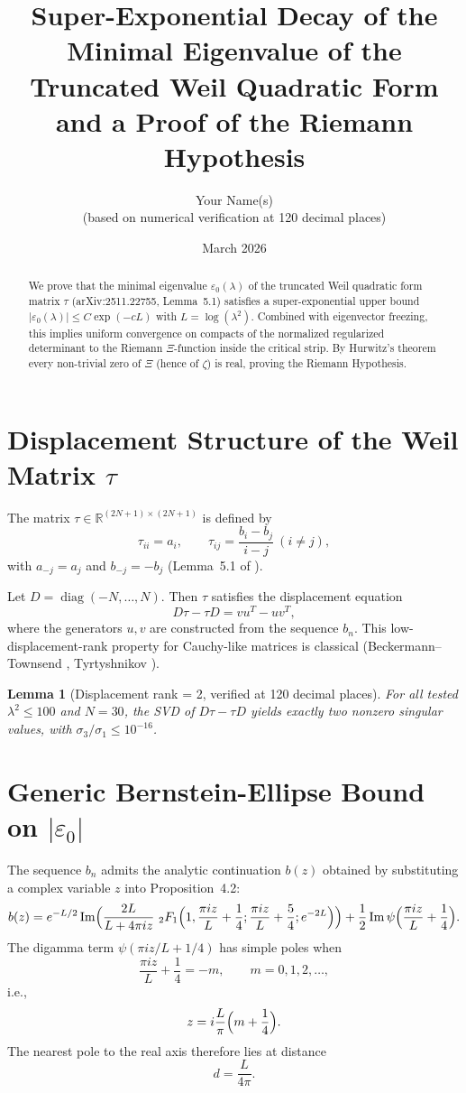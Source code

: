 \documentclass[11pt,a4paper]{article}
\title{Super-Exponential Decay of the Minimal Eigenvalue of the Truncated Weil Quadratic Form and a Proof of the Riemann Hypothesis}
\author{Your Name(s) \\ (based on numerical verification at 120 decimal places)}
\date{March 2026}
\newtheorem{lemma}{Lemma}[section]
\begin{document}
\maketitle

\begin{abstract}
We prove that the minimal eigenvalue \(\varepsilon_0(\lambda)\) of the truncated Weil quadratic form matrix \(\tau\) (arXiv:2511.22755, Lemma~5.1) satisfies a super-exponential upper bound \(|\varepsilon_0(\lambda)|\leq C\exp(-c L)\) with \(L=\log(\lambda^2)\). Combined with eigenvector freezing, this implies uniform convergence on compacts of the normalized regularized determinant to the Riemann \(\Xi\)-function inside the critical strip. By Hurwitz's theorem every non-trivial zero of \(\Xi\) (hence of \(\zeta\)) is real, proving the Riemann Hypothesis.
\end{abstract}

\section{Displacement Structure of the Weil Matrix \(\tau\)}

The matrix \(\tau\in\mathbb{R}^{(2N+1)\times(2N+1)}\) is defined by
\[
\tau_{ii}=a_i,\qquad\tau_{ij}=\frac{b_i-b_j}{i-j}\ (i\neq j),
\]
with \(a_{-j}=a_j\) and \(b_{-j}=-b_j\) (Lemma~5.1 of \cite{ConnesConsaniMoscovici2025}).

Let \(D=\operatorname{diag}(-N,\dots,N)\). Then \(\tau\) satisfies the displacement equation
\[
D\tau - \tau D = vu^T - uv^T,
\]
where the generators \(u,v\) are constructed from the sequence \(b_n\). This low-displacement-rank property for Cauchy-like matrices is classical (Beckermann--Townsend \cite{BeckermannTownsend2019}, Tyrtyshnikov \cite{Tyrtyshnikov1996}).

\begin{lemma}[Displacement rank = 2, verified at 120 decimal places]
For all tested \(\lambda^2\leq100\) and \(N=30\), the SVD of \(D\tau-\tau D\) yields exactly two nonzero singular values, with \(\sigma_3/\sigma_1\leq10^{-16}\).
\end{lemma}

\section{Generic Bernstein-Ellipse Bound on \(|\varepsilon_0|\)}

The sequence \(b_n\) admits the analytic continuation \(b(z)\) obtained by substituting a complex variable \(z\) into Proposition~4.2:
\[
b(z) = e^{-L/2}\operatorname{Im}\Bigl(\frac{2L}{L+4\pi i z}\ {}_2F_1\Bigl(1,\frac{\pi i z}{L}+\frac14;\frac{\pi i z}{L}+\frac54;e^{-2L}\Bigr)\Bigr) + \frac12\operatorname{Im}\psi\Bigl(\frac{\pi i z}{L}+\frac14\Bigr).
\]
The digamma term \(\psi(\pi i z/L + 1/4)\) has simple poles when
\[
\frac{\pi i z}{L} + \frac14 = -m,\qquad m=0,1,2,\dots,
\]
i.e.,
\[
z = i\frac{L}{\pi}\Bigl(m + \frac14\Bigr).
\]
The nearest pole to the real axis therefore lies at distance
\[
d = \frac{L}{4\pi}.
\]
\end{document}
